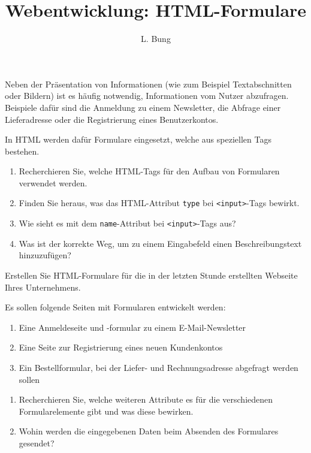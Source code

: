 \documentclass[11pt, a4paper, oneside]{article}
\begin{document}
	\author{L. Bung}
	\title{Webentwicklung: \hspace{10cm} HTML-Formulare}
	\subject{SAE}
	\maketitle
	
	Neben der Präsentation von Informationen (wie zum Beispiel Textabschnitten oder Bildern) ist es häufig notwendig, Informationen vom Nutzer abzufragen.
	Beispiele dafür sind die Anmeldung zu einem Newsletter, die Abfrage einer Lieferadresse oder die Registrierung eines Benutzerkontos.
	
	In HTML werden dafür Formulare eingesetzt, welche aus speziellen Tags bestehen.
	
	
	
	\begin{enumerate}[label=\alph*)]
		\item Recherchieren Sie, welche HTML-Tags für den Aufbau von Formularen verwendet werden.
		\item Finden Sie heraus, was das HTML-Attribut \texttt{type} bei \texttt{<input>}-Tags bewirkt.
		\item Wie sieht es mit dem \texttt{name}-Attribut bei \texttt{<input>}-Tags aus?
		\item Was ist der korrekte Weg, um zu einem Eingabefeld einen Beschreibungstext hinzuzufügen?
	\end{enumerate}
	
	\lines[14cm]
	
	
	
	Erstellen Sie HTML-Formulare für die in der letzten Stunde erstellten Webseite Ihres Unternehmens.
	
	Es sollen folgende Seiten mit Formularen entwickelt werden:
	
	\begin{enumerate}[label=\alph*)]
		\item Eine Anmeldeseite und -formular zu einem E-Mail-Newsletter
		\item Eine Seite zur Registrierung eines neuen Kundenkontos
		\item Ein Bestellformular, bei der Liefer- und Rechnungsadresse abgefragt werden sollen
	\end{enumerate}
	
	
	
	\begin{enumerate}[label=\alph*)]
		\item Recherchieren Sie, welche weiteren Attribute es für die verschiedenen Formularelemente gibt und was diese bewirken.
		\item Wohin werden die eingegebenen Daten beim Absenden des Formulares gesendet?
	\end{enumerate}
	
\end{document}
